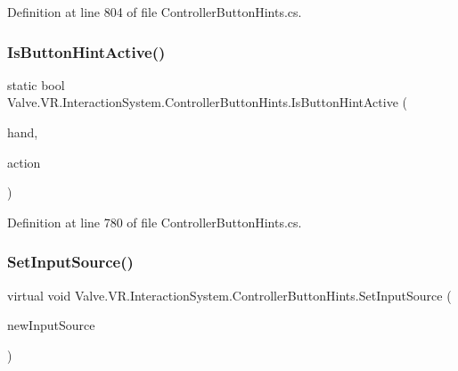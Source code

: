 Definition at line 804 of file Controller\+Button\+Hints.\+cs.

\mbox{\label{class_valve_1_1_v_r_1_1_interaction_system_1_1_controller_button_hints_ada4167a32d9f46f9449972d3e32fd625}} 
\subsubsection{\texorpdfstring{IsButtonHintActive()}{IsButtonHintActive()}}
{\footnotesize\ttfamily static bool Valve.\+V\+R.\+Interaction\+System.\+Controller\+Button\+Hints.\+Is\+Button\+Hint\+Active (\begin{DoxyParamCaption}\item[{\mbox{\hyperlink{class_valve_1_1_v_r_1_1_interaction_system_1_1_hand}{Hand}}}]{hand,  }\item[{\mbox{\hyperlink{interface_valve_1_1_v_r_1_1_i_steam_v_r___action___in___source}{I\+Steam\+V\+R\+\_\+\+Action\+\_\+\+In\+\_\+\+Source}}}]{action }\end{DoxyParamCaption})\hspace{0.3cm}{\ttfamily [static]}}



Definition at line 780 of file Controller\+Button\+Hints.\+cs.

\mbox{\label{class_valve_1_1_v_r_1_1_interaction_system_1_1_controller_button_hints_a2fe333f357924080487804c3e1281a41}} 
\subsubsection{\texorpdfstring{SetInputSource()}{SetInputSource()}}
{\footnotesize\ttfamily virtual void Valve.\+V\+R.\+Interaction\+System.\+Controller\+Button\+Hints.\+Set\+Input\+Source (\begin{DoxyParamCaption}\item[{\mbox{\hyperlink{namespace_valve_1_1_v_r_a82e5bf501cc3aa155444ee3f0662853f}{Steam\+V\+R\+\_\+\+Input\+\_\+\+Sources}}}]{new\+Input\+Source }\end{DoxyParamCaption})\hspace{0.3cm}{\ttfamily [virtual]}}



